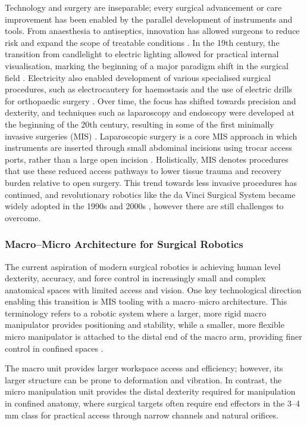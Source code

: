 \documentclass[12pt]{article}
\begin{document}
Technology and surgery are inseparable; every surgical advancement or care improvement has been enabled by the parallel development of instruments and tools.
From anaesthesia to antiseptics, innovation has allowed surgeons to reduce risk and expand the scope of treatable conditions \cite{vitiello2013emerging}.
In the 19th century, the transition from candlelight to electric lighting allowed for practical internal visualisation, 
marking the beginning of a major paradigm shift in the surgical field \parencite{hargest2021five}.
Electricity also enabled development of various specialised surgical procedures, such as electrocautery for haemostasis and the use of electric drills for orthopaedic surgery \cite{hargest2021five}.
Over time, the focus has shifted towards precision and dexterity, and techniques such as laparoscopy and endoscopy were developed at the beginning of the 20th century, resulting in some of the first minimally invasive surgeries (MIS) \cite{hatzinger2014ott}.
Laparoscopic surgery is a core MIS approach in which instruments are inserted
through small abdominal incisions using trocar access ports, rather than a
large open incision \cite{ko2025tool}. Holistically, MIS denotes procedures
that use these reduced access pathways to lower tissue trauma and recovery
burden relative to open surgery.
This trend towards less invasive procedures has continued, and revolutionary robotics like the da Vinci Surgical System became widely adopted in the 1990s and 2000s \cite{davinci_intuitive},
however there are still challenges to overcome.

\subsubsection{Macro--Micro Architecture for Surgical Robotics}

The current aspiration of modern surgical robotics is achieving human level dexterity,
accuracy, and force control in increasingly small and complex anatomical spaces with limited access and vision.
One key technological direction enabling this transition is MIS tooling with a macro--micro architecture. This terminology refers to a robotic system where a larger, more rigid macro manipulator provides positioning and stability,
while a smaller, more flexible micro manipulator is attached to the distal end of the macro arm, providing finer control in confined spaces \cite{scott2023macro}.

The macro unit provides larger workspace access and efficiency; however,
its larger structure can be prone to deformation and vibration. In contrast, the micro manipulation unit provides the distal dexterity required for manipulation in confined anatomy, where surgical
targets often require end effectors in the 3--4 mm class for practical access
through narrow channels and natural orifices.
\end{document}

